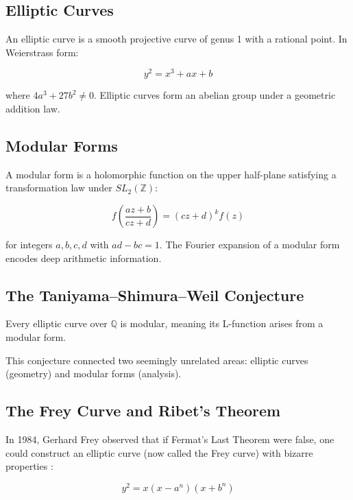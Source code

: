 \subsection{Elliptic Curves}

An elliptic curve is a smooth projective curve of genus 1 with a rational point. In Weierstrass form:

\begin{equation}
y^2 = x^3 + ax + b
\end{equation}

where $4a^3 + 27b^2 \neq 0$. Elliptic curves form an abelian group under a geometric addition law.

\subsection{Modular Forms}

A modular form is a holomorphic function on the upper half-plane satisfying a transformation law under $SL_2(\mathbb{Z})$:

\begin{equation}
f\left(\frac{az+b}{cz+d}\right) = (cz+d)^k f(z)
\end{equation}

for integers $a,b,c,d$ with $ad-bc = 1$. The Fourier expansion of a modular form encodes deep arithmetic information.

\subsection{The Taniyama--Shimura--Weil Conjecture}

\begin{conjecture}
Every elliptic curve over $\mathbb{Q}$ is modular, meaning its L-function arises from a modular form.
\end{conjecture}

This conjecture connected two seemingly unrelated areas: elliptic curves (geometry) and modular forms (analysis).

\subsection{The Frey Curve and Ribet's Theorem}

In 1984, Gerhard Frey observed that if Fermat's Last Theorem were false, one could construct an elliptic curve (now called the Frey curve) with bizarre properties \cite{frey1984}:

\begin{equation}
y^2 = x(x - a^n)(x + b^n)
\end{equation}

